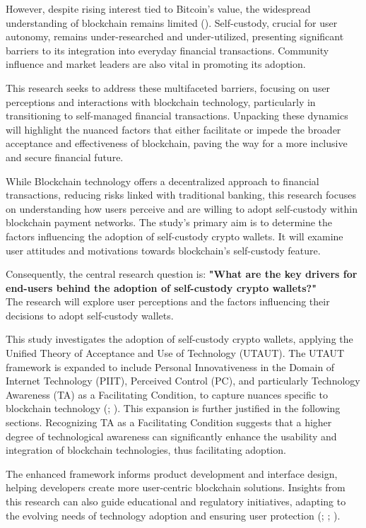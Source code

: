 \documentclass[twocolumn]{article}
\begin{document}
However, despite rising interest tied to Bitcoin's value, the widespread understanding of blockchain remains limited (\cite{hacioglu_impact_2019}). Self-custody, crucial for user autonomy, remains under-researched and under-utilized, presenting significant barriers to its integration into everyday financial transactions. Community influence and market leaders are also vital in promoting its adoption.

This research seeks to address these multifaceted barriers, focusing on user perceptions and interactions with blockchain technology, particularly in transitioning to self-managed financial transactions. Unpacking these dynamics will highlight the nuanced factors that either facilitate or impede the broader acceptance and effectiveness of blockchain, paving the way for a more inclusive and secure financial future.

While Blockchain technology offers a decentralized approach to financial transactions, reducing risks linked with traditional banking, this research focuses on understanding how users perceive and are willing to adopt self-custody within blockchain payment networks. The study's primary aim is to determine the factors influencing the adoption of self-custody crypto wallets. It will examine user attitudes and motivations towards blockchain's self-custody feature.

Consequently, the central research question is: \textbf{"What are the key drivers for end-users behind the adoption of self-custody crypto wallets?"} \\The research will explore user perceptions and the factors influencing their decisions to adopt self-custody wallets.

This study investigates the adoption of self-custody crypto wallets, applying the Unified Theory of Acceptance and Use of Technology (UTAUT). The UTAUT framework is expanded to include Personal Innovativeness in the Domain of Internet Technology (PIIT), Perceived Control (PC), and particularly Technology Awareness (TA) as a Facilitating Condition, to capture nuances specific to blockchain technology (\cite{alomari_factors_2023}; \cite{lampo_how_2022}). This expansion is further justified in the following sections. Recognizing TA as a Facilitating Condition suggests that a higher degree of technological awareness can significantly enhance the usability and integration of blockchain technologies, thus facilitating adoption.

The enhanced framework informs product development and interface design, helping developers create more user-centric blockchain solutions. Insights from this research can also guide educational and regulatory initiatives, adapting to the evolving needs of technology adoption and ensuring user protection (\cite{chang_acceptance_2022}; \cite{kabir_application_2021}; \cite{queiroz_blockchain_2019}).
\end{document}
